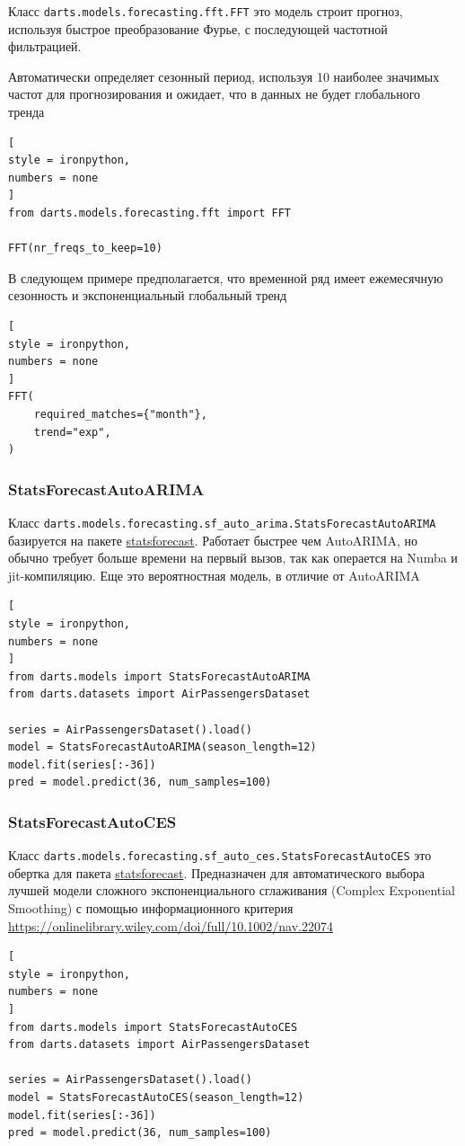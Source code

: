 \documentclass[%
	11pt,
	a4paper,
	utf8,
		]{article}
\begin{document}
Класс \verb|darts.models.forecasting.fft.FFT| это модель строит прогноз, используя быстрое преобразование Фурье, с последующей частотной фильтрацией.

Автоматически определяет сезонный период, используя 10 наиболее значимых частот для прогнозирования и ожидает, что в данных не будет глобального тренда
\begin{lstlisting}[
style = ironpython,
numbers = none
]
from darts.models.forecasting.fft import FFT

FFT(nr_freqs_to_keep=10)
\end{lstlisting}

В следующем примере предполагается, что временной ряд имеет ежемесячную сезонность и экспоненциальный глобальный тренд
\begin{lstlisting}[
style = ironpython,
numbers = none
]
FFT(
    required_matches={"month"},
    trend="exp",
)
\end{lstlisting}

\subsubsection{StatsForecastAutoARIMA}

Класс \verb|darts.models.forecasting.sf_auto_arima.StatsForecastAutoARIMA| базируется на пакете \href{https://github.com/Nixtla/statsforecast}{statsforecast}. Работает быстрее чем AutoARIMA, но обычно требует больше времени на первый вызов, так как операется на Numba и jit-компиляцию. Еще это вероятностная модель, в отличие от AutoARIMA
\begin{lstlisting}[
style = ironpython,
numbers = none
]
from darts.models import StatsForecastAutoARIMA
from darts.datasets import AirPassengersDataset

series = AirPassengersDataset().load()
model = StatsForecastAutoARIMA(season_length=12)
model.fit(series[:-36])
pred = model.predict(36, num_samples=100)
\end{lstlisting}

\subsubsection{StatsForecastAutoCES}

Класс \verb|darts.models.forecasting.sf_auto_ces.StatsForecastAutoCES| это обертка для пакета \href{https://github.com/Nixtla/statsforecast}{statsforecast}. Предназначен для автоматического выбора лучшей модели сложного экспоненциального сглаживания (Complex Exponential Smoothing) с помощью информационного критерия \url{https://onlinelibrary.wiley.com/doi/full/10.1002/nav.22074}
\begin{lstlisting}[
style = ironpython,
numbers = none
]
from darts.models import StatsForecastAutoCES
from darts.datasets import AirPassengersDataset

series = AirPassengersDataset().load()
model = StatsForecastAutoCES(season_length=12)
model.fit(series[:-36])
pred = model.predict(36, num_samples=100)
\end{lstlisting}
\end{document}
